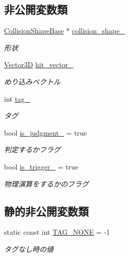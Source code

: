 \subsection*{非公開変数類}
\begin{DoxyCompactItemize}
\item 
\mbox{\hyperlink{class_collision_shape_base}{Collision\+Shape\+Base}} $\ast$ \mbox{\hyperlink{class_collision_object_a4ed81be0cf60ec47e54f83955853a6b1}{collision\+\_\+shape\+\_\+}}
\begin{DoxyCompactList}\small\item\em 形状 \end{DoxyCompactList}\item 
\mbox{\hyperlink{class_vector3_d}{Vector3D}} \mbox{\hyperlink{class_collision_object_a5fb64c6aaab4606a4e0a1058a844d10e}{hit\+\_\+vector\+\_\+}}
\begin{DoxyCompactList}\small\item\em めり込みベクトル \end{DoxyCompactList}\item 
int \mbox{\hyperlink{class_collision_object_a104bfc5534ba8ea189a45de9ba32f6ee}{tag\+\_\+}}
\begin{DoxyCompactList}\small\item\em タグ \end{DoxyCompactList}\item 
bool \mbox{\hyperlink{class_collision_object_a0dd29059add616ce619c72ebce6af720}{is\+\_\+judgment\+\_\+}} = true
\begin{DoxyCompactList}\small\item\em 判定するかフラグ \end{DoxyCompactList}\item 
bool \mbox{\hyperlink{class_collision_object_a5af3618b5605c1bcff1e403c85c3b1ca}{is\+\_\+trigger\+\_\+}} = true
\begin{DoxyCompactList}\small\item\em 物理演算をするかのフラグ \end{DoxyCompactList}\end{DoxyCompactItemize}
\subsection*{静的非公開変数類}
\begin{DoxyCompactItemize}
\item 
static const int \mbox{\hyperlink{class_collision_object_a22badef1e6fc9c2b1f002bd99ede049f}{T\+A\+G\+\_\+\+N\+O\+NE}} = -\/1
\begin{DoxyCompactList}\small\item\em タグなし時の値 \end{DoxyCompactList}\end{DoxyCompactItemize}


